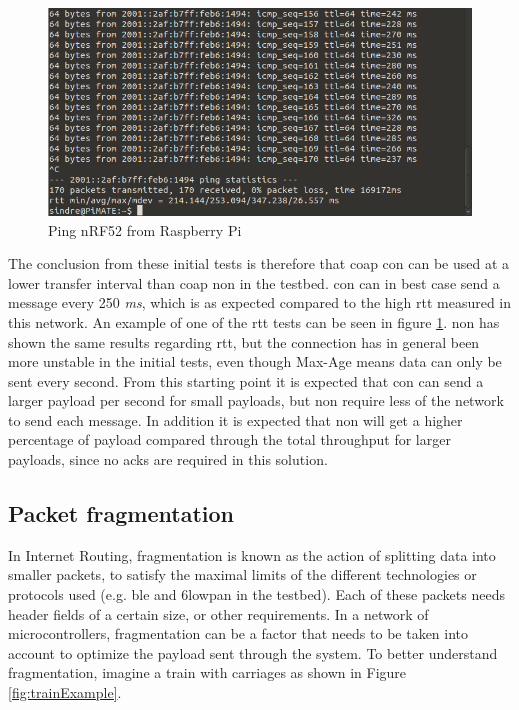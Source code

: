 \begin{figure}[ht]
    \centering
    \includegraphics[width=1.0\textwidth]{ping4.png}    
    \caption{Ping nRF52 from Raspberry Pi}
    \label{fig:ping3}
\end{figure}


\noindent The conclusion from these initial tests is therefore that \gls{coap} \gls{con} can be used at a lower transfer interval than \gls{coap} \gls{non} in the testbed. \gls{con} can in best case send a message every 250 \textit{ms}, which is as expected compared to the high \gls{rtt} measured in this network. An example of one of the \gls{rtt} tests can be seen in figure \ref{fig:ping3}. \gls{non} has shown the same results regarding \gls{rtt}, but the connection has in general been more unstable in the initial tests, even though Max-Age means data can only be sent every second. From this starting point it is expected that \gls{con} can send a larger \gls{payload} per second for small \glspl{payload}, but \gls{non} require less of the network to send each message. In addition it is expected that \gls{non} will get a higher percentage of \gls{payload} compared through the total throughput for larger \glspl{payload}, since no \glspl{ack} are required in this solution. 



\subsection{Packet fragmentation}

\noindent In Internet Routing, fragmentation is known as the action of splitting data into smaller \glspl{packet}, to satisfy the maximal limits of the different technologies or protocols used (e.g. \gls{ble} and \gls{6lowpan} in the testbed). Each of these packets needs header fields of a certain size, or other requirements. In a network of \glspl{microcontroller}, fragmentation can be a factor that needs to be taken into account to optimize the \gls{payload} sent through the system. To better understand fragmentation, imagine a train with carriages as shown in Figure \ref{fig:trainExample}. 

